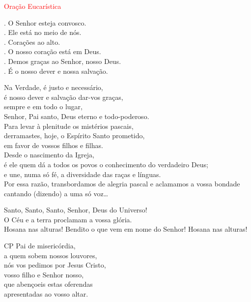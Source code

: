 \documentclass{book}
\begin{document}
\newpage

\begin{center}

    \textcolor{red}{Oração Eucarística}

\end{center}

\begin{flushleft}
    {\color{red} \Vbar.} O Senhor esteja convosco. \\
    {\color{red} \Rbar.} Ele está no meio de nós. \\
    {\color{red} \Vbar.} Corações ao alto. \\
    {\color{red} \Rbar.} O nosso coração está em Deus. \\
    {\color{red} \Vbar.} Demos graças ao Senhor, nosso Deus. \\
    {\color{red} \Rbar.} É o nosso dever e nossa salvação.

    Na Verdade, é justo e necessário, \\
    é nosso dever e salvação dar-vos graças, \\
    sempre e em todo o lugar, \\
    Senhor, Pai santo, Deus eterno e todo-poderoso. \\
    Para levar à plenitude os mistérios pascais, \\
    derramastes, hoje, o Espírito Santo prometido, \\
    em favor de vossos filhos e filhas. \\
    Desde o nascimento da Igreja, \\
    é ele quem dá a todos os povos o conhecimento do verdadeiro Deus; \\
    e une, numa só fé, a diversidade das raças e línguas. \\
    Por essa razão, transbordamos de alegria pascal e aclamamos a vossa bondade cantando (dizendo) a uma só voz…

    Santo, Santo, Santo, Senhor, Deus do Universo! \\
    O Céu e a terra proclamam a vossa glória. \\
    Hosana nas alturas! Bendito o que vem em nome do Senhor! Hosana nas alturas!

    CP Pai de misericórdia, \\
    a quem sobem nossos louvores, \\
    nós vos pedimos por Jesus Cristo, \\
    vosso filho e Senhor nosso, \\
    que abençoeis {\color{red} \grecross} estas oferendas \\
    apresentadas ao vosso altar.


\end{flushleft}
\end{document}
